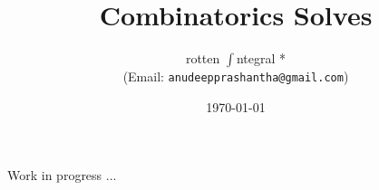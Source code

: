 \documentclass[a4paper, 11pt]{article}
\title{\textbf{Combinatorics Solves}}
\author{rotten $\int$ntegral *\\(Email: \texttt{anudeepprashantha@gmail.com})}
\date{\today}
\begin{document}
\maketitle
    \tableofcontents
	Work in progress ...
\end{document}

